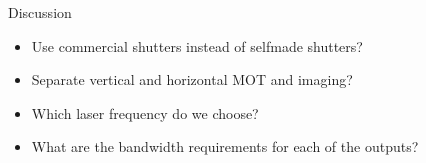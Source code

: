 \documentclass[aspectratio=169]{beamer}
\begin{document}
	\begin{frame}{Discussion}
		\begin{itemize}
			\item Use commercial shutters instead of selfmade shutters?
			\item Separate vertical and horizontal MOT and imaging?
			\item Which laser frequency do we choose?
			\item What are the bandwidth requirements for each of the outputs?
		\end{itemize}
	\end{frame}
	
\end{document}
